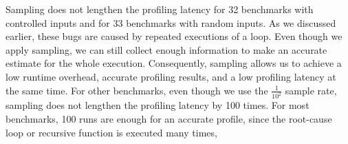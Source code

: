 Sampling does not lengthen the profiling latency for 32 benchmarks 
with controlled 
inputs and for 33 benchmarks with random inputs.
As we discussed earlier, these bugs are caused by repeated executions of a loop. 
Even though we apply sampling, 
we can still collect enough information to make an accurate estimate for the whole execution. 
Consequently, sampling allows us to achieve a low runtime overhead, 
accurate profiling results, and a low profiling latency at the same time. 
For other benchmarks, even though we use the $\frac{1}{10^2}$ sample rate, 
sampling does not lengthen the profiling latency by 100 times. 
For most benchmarks, 100 runs are enough for an accurate profile, 
since the root-cause loop or recursive function is executed many times, 